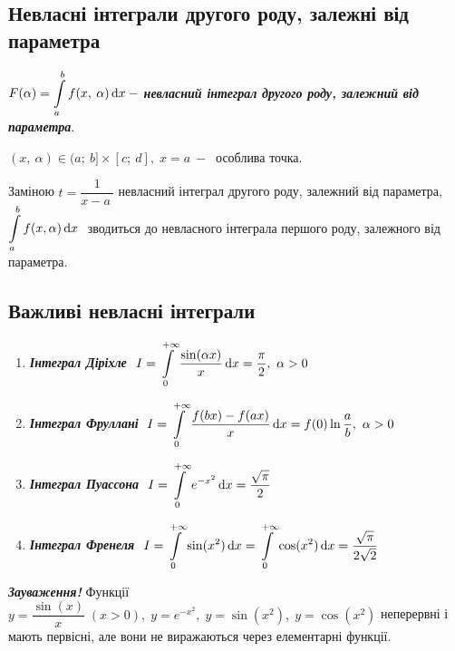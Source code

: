 \subsection{\large{Невласні інтеграли другого роду, залежні від параметра}}
 $F(\alpha) =  \displaystyle\int\limits_a^b f(x, \: \alpha) \, \mathrm{d}x  \: -$  \textcolor{NavyBlue}{\textbf{\textit{невласний інтеграл другого роду, залежний від параметра}}}.
 
 
$(x, \: \alpha) \in (a; \: b] \times [c; \: d], \; x=a \: - \:$ особлива точка.

Заміною $t=\dfrac{1}{x-a\:}$ невласний інтеграл другого роду, залежний від параметра, $ \displaystyle\int\limits_a^b f(x, \alpha) \, \mathrm{d}x \ $ зводиться до невласного інтеграла першого роду, залежного від параметра.

\subsection{\large{Важливі невласні інтеграли}}

       \begin{enumerate}
           \item \textcolor{NavyBlue}{\textbf{\textit{Інтеграл Діріхле}}}   $ \ I=\Int_0^{+\infty} \dfrac{\sin({\alpha x})}{x} \, \mathrm{d}x=\dfrac{\pi}{2}, \ \alpha > 0$
           \item \textcolor{NavyBlue}{\textbf{\textit{Інтеграл Фруллані}}}   $ \ I=\Int_0^{+\infty} \dfrac{f(bx)-f(ax)}{x} \, \mathrm{d}x=f(0)  \ln{\dfrac{a}{b}}, \ \alpha > 0$
           \item \textcolor{NavyBlue}{\textbf{\textit{Інтеграл Пуассона}}} $ \ I=\Int_0^{+\infty} e^{-x^2} \, \mathrm{d}x=\dfrac{\sqrt \pi}{2}$
           \item \textcolor{NavyBlue}{\textbf{\textit{Інтеграл Френеля}}}  $ \ I=\Int_0^{+\infty} \sin({x^2}) \, \mathrm{d}x
=\Int_0^{+\infty} \cos({x^2}) \, \mathrm{d}x = \dfrac{\sqrt \pi}{2\sqrt{2}}$
       \end{enumerate}
\textcolor{NavyBlue}{\textbf{\textit{Зауваження!}}} Функції
$y=\dfrac{\sin(x)}{x} \; (x > 0), \; y=e^{-x^2}, \;y=\sin({x^2}), \;y=\cos({x^2})$
неперервні і мають первісні, але вони не виражаються через елементарні функції. 
\newpage
